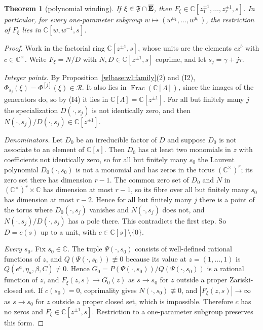 \documentclass[11pt,a4paper]{article}
\newtheorem{theorem}{Theorem}[section]
\theoremstyle{definition}\newtheorem{definition}[theorem]{Definition}
\theoremstyle{remark}\newtheorem{remark}[theorem]{Remark}
\newcommand{\cR}{\mathcal R}\newcommand{\cM}{\mathcal M}
\newcommand{\F}{\mathfrak F}\newcommand{\FF}{\mathbb F}
\newcommand{\C}{\mathbb C}\newcommand{\Z}{\mathbb Z}
\DeclareMathOperator{\Frac}{Frac}\DeclareMathOperator{\ord}{ord}
\begin{document}
\begin{theorem}[polynomial winding]\label{wlbase:wl:poly}
If $\xi\in\F\cap\Ebar$, then
$F_\xi\in\C[z_1^{\pm1},\dots,z_r^{\pm1},s]$. In particular, for every
one-parameter subgroup $w\mapsto(w^{u_1},\dots,w^{u_r})$, the restriction of
$F_\xi$ lies in $\C[w,w^{-1},s]$.
\end{theorem}

\begin{proof}
Work in the factorial ring $\C[z^{\pm1},s]$, whose units are the elements
$cz^b$ with $c\in\C^\times$. Write $F_\xi=N/D$ with $N,D\in\C[z^{\pm1},s]$
coprime, and let $s_j=\gamma+j\tau$.

\emph{Integer points.} By Proposition~\ref{wlbase:wl:family}(2) and (I2),
$\Phi_{s_j}(\xi)=\Phi^{[j]}(\xi)\in\cR$. It also lies in $\Frac(\C[\Lambda])$,
since the images of the generators do, so by (I4) it lies in
$\C[\Lambda]=\C[z^{\pm1}]$. For all but finitely many $j$ the specialization
$D(\cdot,s_j)$ is not identically zero, and then
$N(\cdot,s_j)/D(\cdot,s_j)\in\C[z^{\pm1}]$.

\emph{Denominators.} Let $D_0$ be an irreducible factor of $D$ and suppose
$D_0$ is not associate to an element of $\C[s]$. Then $D_0$ has at least two
monomials in $z$ with coefficients not identically zero, so for all but
finitely many $s_0$ the Laurent polynomial $D_0(\cdot,s_0)$ is not a monomial
and has zeros in the torus $(\C^\times)^r$; its zero set there has dimension
$r-1$. The common zero set of $D_0$ and $N$ in $(\C^\times)^r\times\C$ has
dimension at most $r-1$, so its fibre over all but finitely many $s_0$ has
dimension at most $r-2$. Hence for all but finitely many $j$ there is a point
of the torus where $D_0(\cdot,s_j)$ vanishes and $N(\cdot,s_j)$ does not,
and $N(\cdot,s_j)/D(\cdot,s_j)$ has a pole there. This contradicts the first
step. So $D=c(s)$ up to a unit, with $c\in\C[s]\setminus\{0\}$.

\emph{Every $s_0$.} Fix $s_0\in\C$. The tuple $\Psi(\cdot,s_0)$ consists of
well-defined rational functions of $z$, and $Q(\Psi(\cdot,s_0))\not\equiv0$
because its value at $z=(1,\dots,1)$ is $Q(e^a,\eta_a,\beta,C)\ne0$. Hence
$G_0=P(\Psi(\cdot,s_0))/Q(\Psi(\cdot,s_0))$ is a rational function of $z$,
and $F_\xi(z,s)\to G_0(z)$ as $s\to s_0$ for $z$ outside a proper Zariski-closed
set. If $c(s_0)=0$, coprimality gives $N(\cdot,s_0)\not\equiv0$, and
$|F_\xi(z,s)|\to\infty$ as $s\to s_0$ for $z$ outside a proper closed set,
which is impossible. Therefore $c$ has no zeros and
$F_\xi\in\C[z^{\pm1},s]$. Restriction to a one-parameter subgroup preserves
this form.
\end{proof}
\end{document}
